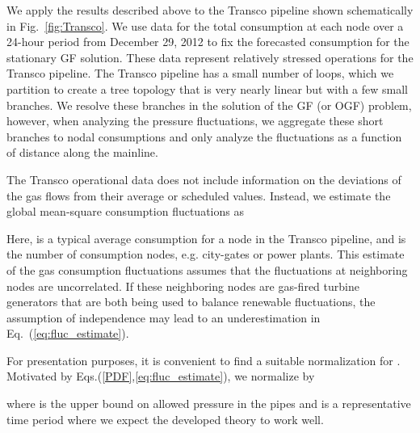 \documentclass[10pt, conference, compsocconf]{IEEEtran}
\begin{document}
We apply the results described above to the Transco pipeline shown schematically in Fig.~\ref{fig:Transco}.  We use data for the total consumption at each node over a 24-hour period from December 29, 2012 to fix the forecasted consumption for the stationary GF solution. These data represent relatively stressed operations for the Transco pipeline.  The Transco pipeline has a small number of loops, which we partition to create a tree topology \cite{13MFBBCP} that is very nearly linear but with a few small branches.  We resolve these branches in the solution of the GF (or OGF) problem, however, when analyzing the pressure fluctuations, we aggregate these short branches to nodal consumptions and only analyze the fluctuations as a function of distance along the mainline.

The Transco operational data does not include information on the deviations of the gas flows from their average or scheduled values. Instead, we estimate the global mean-square consumption fluctuations as

Here,  is a typical average consumption for a node in the Transco pipeline, and  is the number of consumption nodes, e.g. city-gates or power plants. This estimate of the gas consumption fluctuations assumes that the fluctuations at neighboring nodes are uncorrelated. If these neighboring nodes are gas-fired turbine generators that are both being used to balance renewable fluctuations, the assumption of independence may lead to an underestimation in Eq.~(\ref{eq:fluc_estimate}).

For presentation purposes, it is convenient to find a suitable normalization for .  Motivated by Eqs.(\ref{PDF},\ref{eq:fluc_estimate}), we normalize  by

where  is the upper
bound on allowed pressure in the pipes and  is a representative time period where we expect the developed theory to
work well.
\end{document}
